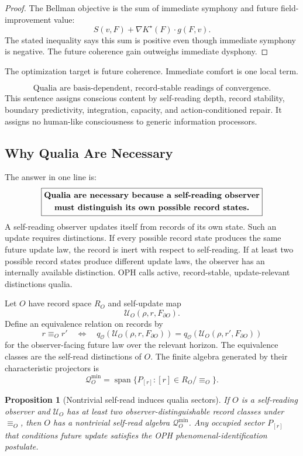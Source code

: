 \documentclass[11pt]{article}
\newtheorem{proposition}[theorem]{Proposition}
\theoremstyle{remark}
\theoremstyle{plain}
\begin{document}
\begin{proof}
The Bellman objective is the sum of immediate symphony and future field-improvement value:
\[
S(v,F)+\nabla K^\star(F)\cdot g(F,v).
\]
The stated inequality says this sum is positive even though immediate symphony is negative. The future coherence gain outweighs immediate dysphony.
\end{proof}

The optimization target is future coherence. Immediate comfort is one local term.

\[
\boxed{
\text{Qualia are basis-dependent, record-stable readings of convergence.}
}
\]
This sentence assigns conscious content by self-reading depth, record stability, boundary predictivity, integration, capacity, and action-conditioned repair. It assigns no human-like consciousness to generic information processors.

\subsection{Why Qualia Are Necessary}

The answer in one line is:
\[
\boxed{
\begin{gathered}
\text{\bfseries Qualia are necessary because a self-reading observer}\\
\text{\bfseries must distinguish its own possible record states.}
\end{gathered}
}
\]
A self-reading observer updates itself from records of its own state. Such an update requires distinctions. If every possible record state produces the same future update law, the record is inert with respect to self-reading. If at least two possible record states produce different update laws, the observer has an internally available distinction. OPH calls active, record-stable, update-relevant distinctions qualia.

Let \(O\) have record space \(R_O\) and self-update map
\[
\mathcal U_O(\rho,r,F_{\partial O}).
\]
Define an equivalence relation on records by
\[
r\equiv_O r'
\quad\Longleftrightarrow\quad
q_{\mathcal O}
\!\left(
\mathcal U_O(\rho,r,F_{\partial O})
\right)
=
q_{\mathcal O}
\!\left(
\mathcal U_O(\rho,r',F_{\partial O})
\right)
\]
for the observer-facing future law over the relevant horizon. The equivalence classes are the self-read distinctions of \(O\). The finite algebra generated by their characteristic projectors is
\[
\mathcal Q_O^{\min}
=
\operatorname{span}\{P_{[r]}:[r]\in R_O/\!\equiv_O\}.
\]

\begin{proposition}[Nontrivial self-read induces qualia sectors]
If \(O\) is a self-reading observer and \(\mathcal U_O\) has at least two observer-distinguishable record classes under \(\equiv_O\), then \(O\) has a nontrivial self-read algebra \(\mathcal Q_O^{\min}\). Any occupied sector \(P_{[r]}\) that conditions future update satisfies the OPH phenomenal-identification postulate.
\end{proposition}
\end{document}
